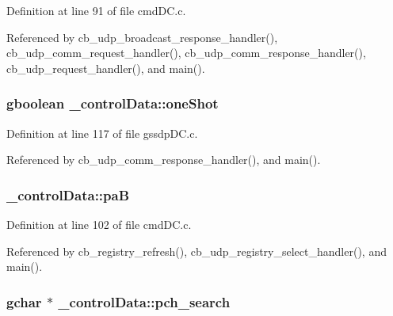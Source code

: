 Definition at line 91 of file cmd\+D\+C.\+c.



Referenced by cb\+\_\+udp\+\_\+broadcast\+\_\+response\+\_\+handler(), cb\+\_\+udp\+\_\+comm\+\_\+request\+\_\+handler(), cb\+\_\+udp\+\_\+comm\+\_\+response\+\_\+handler(), cb\+\_\+udp\+\_\+request\+\_\+handler(), and main().

\hypertarget{struct__control_data_a772b5b4e4d92eee73100445963cbe682}{
\subsubsection[{one\+Shot}]{\setlength{\rightskip}{0pt plus 5cm}gboolean \+\_\+control\+Data\+::one\+Shot}}\label{struct__control_data_a772b5b4e4d92eee73100445963cbe682}


Definition at line 117 of file gssdp\+D\+C.\+c.



Referenced by cb\+\_\+udp\+\_\+comm\+\_\+response\+\_\+handler(), and main().

\hypertarget{struct__control_data_a93f6e099a56c0d476607b4bd5a9dfa58}{
\subsubsection[{pa\+B}]{ \+\_\+control\+Data\+::pa\+B}}\label{struct__control_data_a93f6e099a56c0d476607b4bd5a9dfa58}


Definition at line 102 of file cmd\+D\+C.\+c.



Referenced by cb\+\_\+registry\+\_\+refresh(), cb\+\_\+udp\+\_\+registry\+\_\+select\+\_\+handler(), and main().

\hypertarget{struct__control_data_aae1d10aba11260e77341d9f5fa6055e2}{
\subsubsection[{pch\+\_\+search}]{\setlength{\rightskip}{0pt plus 5cm}gchar $\ast$ \+\_\+control\+Data\+::pch\+\_\+search}}\label{struct__control_data_aae1d10aba11260e77341d9f5fa6055e2}


